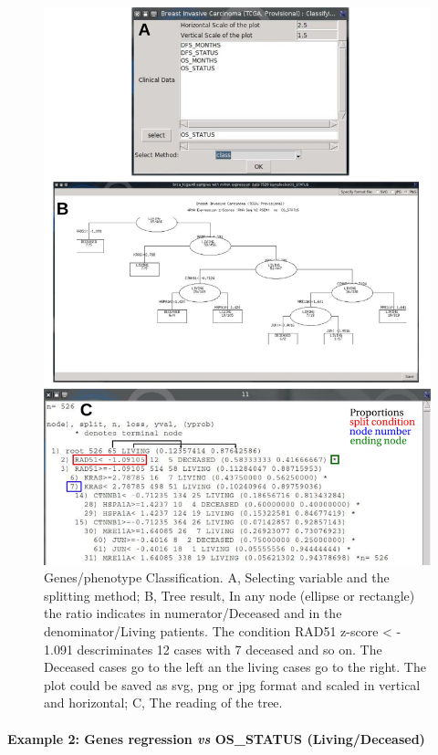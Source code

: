 \documentclass[a4paper]{article}
\begin{document}
\begin{figure}[!ht]
  \centering
 \includegraphics[scale=1]{image/GenePhenoClass1.png}
 \caption{Genes/phenotype Classification. A, Selecting variable and the splitting method; B, Tree result, In any node (ellipse or rectangle) the ratio indicates in numerator/Deceased and in the denominator/Living patients. The condition RAD51 z-score < - 1.091 descriminates 12 cases with 7 deceased and so on. The Deceased cases go to the left an the living cases go to the right. The plot could be saved as svg, png or jpg format and scaled in vertical and horizontal; C, The reading of the tree.}
 \label{GenePhenoClass1}
 \end{figure}


\paragraph{Example 2: Genes regression \emph{vs} OS\_STATUS (Living/Deceased) }
\end{document}

